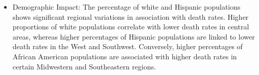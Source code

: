 \documentclass[
]{article}
\providecommand{\tightlist}{%
  \setlength{\itemsep}{0pt}\setlength{\parskip}{0pt}}\usepackage{longtable,booktabs,array}
\begin{document}
\begin{figure}
\begin{minipage}{0.50\linewidth}


\end{minipage}%
%
\begin{minipage}{0.50\linewidth}



\end{minipage}%

\end{figure}%

\begin{itemize}
\tightlist
\item
  Demographic Impact: The percentage of white and Hispanic populations
  shows significant regional variations in association with death rates.
  Higher proportions of white populations correlate with lower death
  rates in central areas, whereas higher percentages of Hispanic
  populations are linked to lower death rates in the West and Southwest.
  Conversely, higher percentages of African American populations are
  associated with higher death rates in certain Midwestern and
  Southeastern regions.
\end{itemize}
\end{document}
